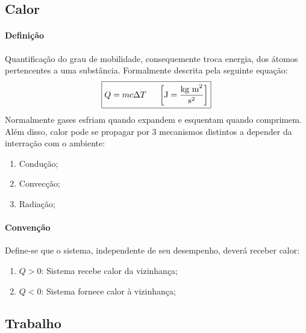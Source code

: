\documentclass{article}
\begin{document}
        \subsection{Calor}
            \paragraph{Definição}Quantificação do grau de mobilidade, consequemente troca energia, dos átomos pertencentes a uma substância. Formalmente descrita pela seguinte equação:
                \[
                    \boxed{Q = mc \Delta T \hspace{5mm} \left[\text{J} = \frac{\text{kg m}^{2}}{\text{s}^{2}}\right]}
                \]
            Normalmente gases esfriam quando expandem e esquentam quando comprimem. Além disso, calor pode se propagar por 3 mecanismos distintos a depender da interração com o ambiente:
                \begin{enumerate}[noitemsep]
                    \item Condução;
                    \item Convecção;
                    \item Radiação;
                \end{enumerate}

            \paragraph{Convenção}Define-se que o sistema, independente de seu desempenho, deverá receber calor:
                \begin{enumerate}[noitemsep]
                    \item $Q>0$: Sistema recebe calor da vizinhança;
                    \item $Q<0$: Sistema fornece calor à vizinhança;
                \end{enumerate}

        \subsection{Trabalho}
\end{document}

